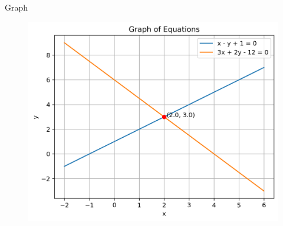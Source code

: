 \documentclass{beamer}
\begin{document}
\begin{frame}{Graph}	
	\begin{figure}
		\centering
		\includegraphics[width=0.8\linewidth]{figs/equations_solution}
		\label{fig:equationssolution}
	\end{figure}
	
	
\end{frame}
\end{document}
